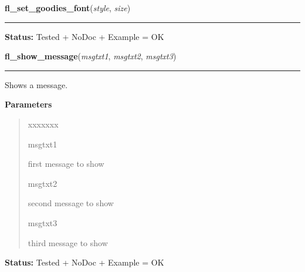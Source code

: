     \label{xformslib:library:fl_set_goodies_font}

    \vspace{0.5ex}

\hspace{.8\funcindent}\begin{boxedminipage}{\funcwidth}

    \raggedright \textbf{fl\_set\_goodies\_font}(\textit{style}, \textit{size})

    \vspace{-1.5ex}

    \rule{\textwidth}{0.5\fboxrule}
\setlength{\parskip}{2ex}
\setlength{\parskip}{1ex}
\textbf{Status:} Tested + NoDoc + Example = OK



    \end{boxedminipage}

    \label{xformslib:library:fl_show_message}

    \vspace{0.5ex}

\hspace{.8\funcindent}\begin{boxedminipage}{\funcwidth}

    \raggedright \textbf{fl\_show\_message}(\textit{msgtxt1}, \textit{msgtxt2}, \textit{msgtxt3})

    \vspace{-1.5ex}

    \rule{\textwidth}{0.5\fboxrule}
\setlength{\parskip}{2ex}
    Shows a message.

\setlength{\parskip}{1ex}
      \textbf{Parameters}
      \vspace{-1ex}

      \begin{quote}
        \begin{Ventry}{xxxxxxx}

          \item[msgtxt1]

          first message to show

          \item[msgtxt2]

          second message to show

          \item[msgtxt3]

          third message to show

        \end{Ventry}

      \end{quote}

\textbf{Status:} Tested + NoDoc + Example = OK



    \end{boxedminipage}

